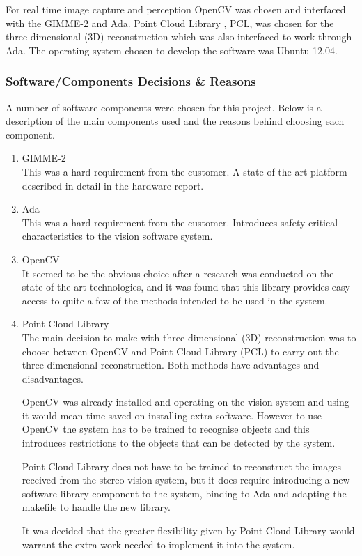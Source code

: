 For real time image capture and perception OpenCV \cite{web:OpenCV} was chosen and interfaced with the GIMME-2 and Ada. Point Cloud Library \cite{web:PCL}, PCL, was chosen for the three dimensional (3D) reconstruction which was also interfaced to work through Ada. The operating system chosen to develop the software was Ubuntu 12.04.

\subsubsection{Software/Components Decisions \& Reasons}
A number of software components were chosen for this project. Below is a description of the main components used and the reasons behind choosing each component. 
\begin{enumerate}
  \item GIMME-2 \\ This was a hard requirement from the customer. A state of the art platform described in detail in the hardware report.
  \item Ada \\ This was a hard requirement from the customer. Introduces safety critical characteristics to the vision software system.
  \item OpenCV \\ It seemed to be the obvious choice after a research was conducted on the state of the art technologies, and it was found that this library provides easy access to quite a few of the methods intended to be used in the system.
  \item Point Cloud Library \\ The main decision to make with three dimensional (3D) reconstruction was to choose between OpenCV and Point Cloud Library (PCL) to carry out the three dimensional reconstruction. Both methods have advantages and disadvantages.

OpenCV was already installed and operating on the vision system and using it would mean time saved on installing extra software. However to use OpenCV the system has to be trained to recognise objects and this introduces restrictions to the objects that can be detected by the system.

Point Cloud Library does not have to be trained to reconstruct the images received from the stereo vision system, but it does require introducing a new software library component to the system, binding to Ada and adapting the makefile to handle the new library.

It was decided that the greater flexibility given by Point Cloud Library would warrant the extra work needed to implement it into the system.
\end{enumerate}

